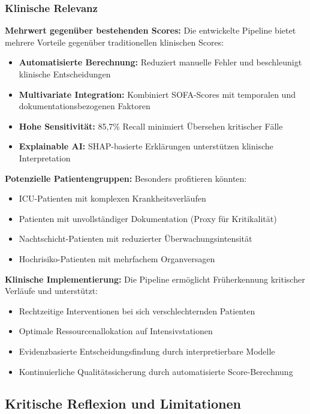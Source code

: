 \documentclass[12pt]{article}
\begin{document}
\subsubsection{Klinische Relevanz}

\textbf{Mehrwert gegenüber bestehenden Scores:}
Die entwickelte Pipeline bietet mehrere Vorteile gegenüber traditionellen klinischen Scores:
\begin{itemize}
    \item \textbf{Automatisierte Berechnung:} Reduziert manuelle Fehler und beschleunigt klinische Entscheidungen
    \item \textbf{Multivariate Integration:} Kombiniert SOFA-Scores mit temporalen und dokumentationsbezogenen Faktoren
    \item \textbf{Hohe Sensitivität:} 85,7\% Recall minimiert Übersehen kritischer Fälle
    \item \textbf{Explainable AI:} SHAP-basierte Erklärungen unterstützen klinische Interpretation
\end{itemize}

\textbf{Potenzielle Patientengruppen:}
Besonders profitieren könnten:
\begin{itemize}
    \item ICU-Patienten mit komplexen Krankheitsverläufen
    \item Patienten mit unvollständiger Dokumentation (Proxy für Kritikalität)
    \item Nachtschicht-Patienten mit reduzierter Überwachungsintensität
    \item Hochrisiko-Patienten mit mehrfachem Organversagen
\end{itemize}

\textbf{Klinische Implementierung:}
Die Pipeline ermöglicht Früherkennung kritischer Verläufe und unterstützt:
\begin{itemize}
    \item Rechtzeitige Interventionen bei sich verschlechternden Patienten
    \item Optimale Ressourcenallokation auf Intensivstationen
    \item Evidenzbasierte Entscheidungsfindung durch interpretierbare Modelle
    \item Kontinuierliche Qualitätssicherung durch automatisierte Score-Berechnung
\end{itemize}

\subsection{Kritische Reflexion und Limitationen}
\end{document}
